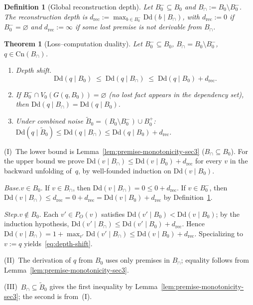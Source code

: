 \documentclass[journal]{IEEEtran}
\makeatletter
\newcommand{\Dd}{\text{Dd}}
\newcommand{\Cn}{\text{Cn}}
\newtheorem{theorem}{Theorem}[section]
\newtheorem{definition}{Definition}[section]
\numberwithin{equation}{section}
\renewenvironment{proof}[1][\proofname]{\par
  \pushQED{\qed}%
  \normalfont \topsep6\p@\@plus6\p@\relax
  \trivlist
  \item[\hskip\labelsep
        \itshape
    #1\@addpunct{.}]\ignorespaces
}{%
  \popQED\endtrivlist\@endpefalse
}
\makeatother
\begin{document}
\begin{definition}[Global reconstruction depth]
\label{def:rec-depth-preserved}
Let $B_0^-\subseteq B_0$ and $B_\cap:=B_0\setminus B_0^-$.
The \emph{reconstruction depth} is
$d_{\mathrm{rec}}:=\max_{b\in B_0^-}\Dd(b\mid B_\cap)$,
with $d_{\mathrm{rec}}:=0$ if $B_0^-=\varnothing$ and
$d_{\mathrm{rec}}:=\infty$ if some lost premise is not
derivable from $B_\cap$.
\end{definition}

\begin{theorem}[Loss--computation duality]
\label{thm:loss-comp-duality}
Let $B_0^-\subseteq B_0$, $B_\cap=B_0\setminus B_0^-$,
$q\in\Cn(B_\cap)$.

\begin{enumerate}[label=\textup{(\Roman*)}]
\item \emph{Depth shift.}
\begin{equation}\label{eq:depth-shift}
  \Dd(q\mid B_0)
  \;\le\;
  \Dd(q\mid B_\cap)
  \;\le\;
  \Dd(q\mid B_0)+d_{\mathrm{rec}}.
\end{equation}

\item If $B_0^-\cap V_0(G(q,B_0))=\varnothing$
\textup{(no lost fact appears in the dependency set)}, then
$\Dd(q\mid B_\cap)=\Dd(q\mid B_0)$.

\item Under combined noise
$\tilde B_0=(B_0\setminus B_0^-)\cup B_0^+$:
$\Dd(q\mid\tilde B_0)\le\Dd(q\mid B_\cap)
 \le\Dd(q\mid B_0)+d_{\mathrm{rec}}$.
\end{enumerate}
\end{theorem}

\begin{proof}
(I)~The lower bound is
Lemma~\ref{lem:premise-monotonicity-sec3} ($B_\cap\subseteq B_0$).
For the upper bound we prove
$\Dd(v\mid B_\cap)\le\Dd(v\mid B_0)+d_{\mathrm{rec}}$
for every $v$ in the backward unfolding of~$q$,
by well-founded induction on $\Dd(v\mid B_0)$.

\emph{Base.}\;$v\in B_0$.
If $v\in B_\cap$, then
$\Dd(v\mid B_\cap)=0\le 0+d_{\mathrm{rec}}$.
If $v\in B_0^-$, then
$\Dd(v\mid B_\cap)\le d_{\mathrm{rec}}
 =0+d_{\mathrm{rec}}=\Dd(v\mid B_0)+d_{\mathrm{rec}}$
by Definition~\ref{def:rec-depth-preserved}.

\emph{Step.}\;$v\notin B_0$.
Each $v'\in P_O(v)$ satisfies
$\Dd(v'\mid B_0)<\Dd(v\mid B_0)$; by the induction
hypothesis,
$\Dd(v'\mid B_\cap)\le\Dd(v'\mid B_0)+d_{\mathrm{rec}}$.
Hence
$\Dd(v\mid B_\cap)
 =1+\max_{v'}\Dd(v'\mid B_\cap)
 \le\Dd(v\mid B_0)+d_{\mathrm{rec}}$.
Specializing to $v:=q$ yields~\eqref{eq:depth-shift}.

(II)~The derivation of $q$ from $B_0$ uses only premises in
$B_\cap$; equality follows from
Lemma~\ref{lem:premise-monotonicity-sec3}.

(III)~$B_\cap\subseteq\tilde B_0$ gives the first inequality by
Lemma~\ref{lem:premise-monotonicity-sec3}; the second is from~(I).
\end{proof}
\end{document}
